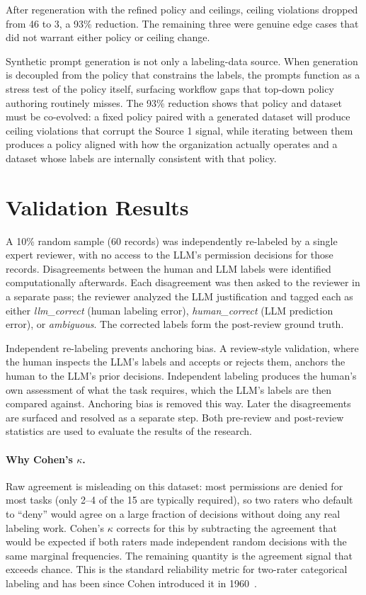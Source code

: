 \documentclass{article}
\theoremstyle{plain}
\theoremstyle{definition}
\theoremstyle{remark}
\begin{document}
After regeneration with the refined policy and ceilings, ceiling 
violations dropped from 46 to 3, a 93\% reduction. The remaining three 
were genuine edge cases that did not warrant either policy or ceiling 
change.

Synthetic prompt generation is not only 
a labeling-data source. When generation is decoupled from the policy 
that constrains the labels, the prompts function as a stress test of the 
policy itself, surfacing workflow gaps that top-down policy authoring 
routinely misses. The 93\% reduction shows that policy and dataset must 
be co-evolved: a fixed policy paired with a generated dataset will 
produce ceiling violations that corrupt the Source 1 signal, while 
iterating between them produces a policy aligned with how the 
organization actually operates and a dataset whose labels are 
internally consistent with that policy.

\section{Validation Results}
A 10\% random sample (60 records) was independently re-labeled by a 
single expert reviewer, with no access to the LLM's permission decisions 
for those records. Disagreements between the human and LLM labels were 
identified computationally afterwards. Each disagreement was then asked 
to the reviewer in a separate pass; the reviewer analyzed the LLM 
justification and tagged each as either \emph{llm\_correct} (human 
labeling error), \emph{human\_correct} (LLM prediction error), or 
\emph{ambiguous}. The corrected labels form the post-review ground truth.

Independent re-labeling prevents anchoring bias. A review-style 
validation, where the human inspects the LLM's labels and accepts or 
rejects them, anchors the human to the LLM's prior decisions. Independent 
labeling produces the human's own assessment of what the task requires, 
which the LLM's labels are then compared against. Anchoring bias is 
removed this way. Later the disagreements are surfaced and resolved as 
a separate step. Both pre-review and post-review statistics are used to evaluate the results of the research.

\paragraph{Why Cohen's $\kappa$.} Raw agreement is misleading on this 
dataset: most permissions are denied for most tasks (only 2--4 of the 
15 are typically required), so two raters who default to ``deny'' would 
agree on a large fraction of decisions without doing any real labeling 
work. Cohen's $\kappa$ corrects for this by subtracting the agreement 
that would be expected if both raters made independent random decisions 
with the same marginal frequencies. The remaining quantity is the 
agreement signal that exceeds chance. This is the standard reliability 
metric for two-rater categorical labeling and has been since Cohen 
introduced it in 1960~\citep{cohen1960coefficient}.
\end{document}
